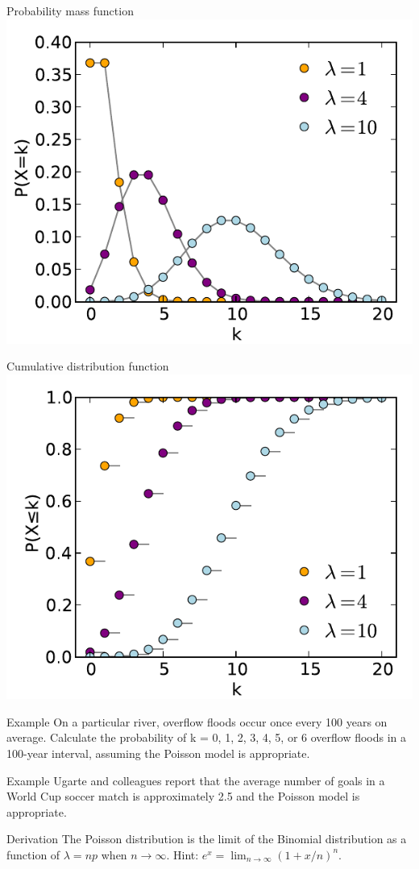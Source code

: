 \documentclass{beamer}
\begin{document}
\begin{frame}{Probability mass function}
  \includegraphics[width=0.9\linewidth]{Poisson_pmf}
\end{frame}

\begin{frame}{Cumulative distribution function}
  \includegraphics[width=0.9\linewidth]{Poisson_cdf}
\end{frame}

\begin{frame}[t]{Example}
  On a particular river, overflow floods occur once every 100 years on
  average. Calculate the probability of k = 0, 1, 2, 3, 4, 5, or 6 overflow
  floods in a 100-year interval, assuming the Poisson model is appropriate.
\end{frame}

\begin{frame}[t]{Example}
  Ugarte and colleagues report that the average number of goals in a World Cup
  soccer match is approximately 2.5 and the Poisson model is appropriate.
\end{frame}

\begin{frame}[t]{Derivation}
  The Poisson distribution is the limit of the Binomial distribution as a
  function of $\lambda = np$ when $n\rightarrow \infty$. Hint: $e^x =
  \lim_{n\rightarrow \infty} (1+x/n)^n$.
\end{frame}
\end{document}
